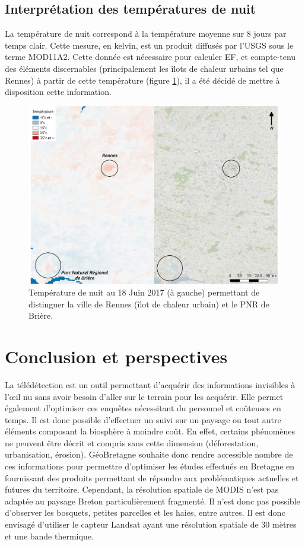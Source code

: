 \documentclass[10pt,a4paper]{article}
\begin{document}
\subsection{Interprétation des températures de nuit}

La température de nuit correspond à la température moyenne sur 8 jours par temps clair. Cette mesure, en kelvin, est un produit diffusés par l'USGS sous le terme MOD11A2. Cette donnée est nécessaire pour calculer EF, et compte-tenu des éléments discernables (principalement les îlots de chaleur urbains tel que Rennes) à partir de cette température (figure \ref{TN1}), il a été décidé de mettre à disposition cette information. \smallbreak 

\begin{figure}[!h]
\centering
\includegraphics[scale=0.33]{img/TN_interpretation1.pdf}
\caption{Température de nuit au 18 Juin 2017 (à gauche) permettant de distinguer la ville de Rennes (îlot de chaleur urbain) et le PNR de Brière.}
\label{TN1}
\end{figure}

\section{Conclusion et perspectives}

La télédétection est un outil permettant d'acquérir des informations invisibles à l’œil nu sans avoir besoin d'aller sur le terrain pour les acquérir. Elle permet également d'optimiser ces enquêtes nécessitant du personnel et coûteuses en temps. Il est donc possible d'effectuer un suivi sur un paysage ou tout autre éléments composant la biosphère à moindre coût. En effet, certains phénomènes ne peuvent être décrit et compris sans cette dimension (déforestation, urbanisation, érosion).\smallbreak
GéoBretagne souhaite donc rendre accessible nombre de ces informations pour permettre d'optimiser les études effectués en Bretagne en fournissant des produits permettant de répondre aux problématiques actuelles et futures du territoire.\smallbreak
Cependant, la résolution spatiale de MODIS n'est pas adaptée au paysage Breton particulièrement fragmenté. Il n'est donc pas possible d'observer les bosquets, petites parcelles et les haies, entre autres. Il est donc envisagé d'utiliser le capteur Landsat ayant une résolution spatiale de 30 mètres et une bande thermique.
\end{document}
